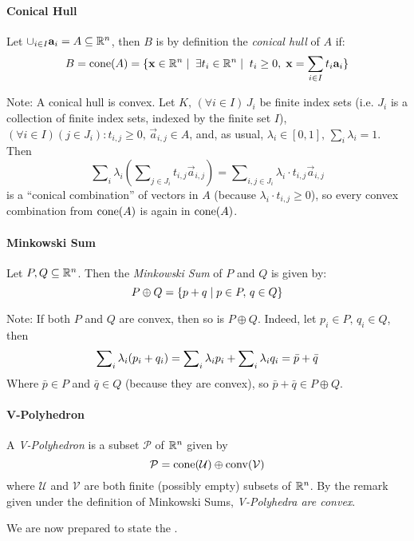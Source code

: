\paragraph{Conical Hull}  Let $\cup_{i\in I} \mathbf{a}_i = A \subseteq \mathbb{R}^n$, then $B$ is by definition the \textit{conical hull} of $A$ if:
  \[ B = \operatorname{cone}(A) = \{ \mathbf{x}\in \mathbb{R}^n \;|\;\; \exists t_i \in \mathbb{R}^n \;|\; \; t_i \geq 0,\; \mathbf{x} = \sum_{i\in I} t_i\mathbf{a}_i \} \]

Note: A conical hull is convex.  Let $K,\, (\forall i\in I)\, J_i$ be finite index sets (i.e. $J_i$ is a collection of finite index sets, indexed by the finite set $I$), $(\forall i \in I)(j \in J_i): t_{i,j} \geq 0,\, \vec{a}_{i,j} \in A$, and, as usual, $\lambda_i \in [0,1],\, \sum_i \lambda_i = 1$.  Then
  \[ \sum\nolimits_i \lambda_i \left(\sum\nolimits_{j \in J_i} t_{i,j} \vec{a}_{i,j}\right) = \sum\nolimits_{i,j\in J_i} \lambda_i \cdot t_{i,j} \vec{a}_{i,j}\]
is a ``conical combination'' of vectors in $A$ (because $\lambda_i\cdot t_{i,j} \geq 0$), so every convex combination from $\operatorname{cone}(A)$ is again in $\operatorname{cone}(A)$.

\paragraph{Minkowski Sum}
Let $P,Q \subseteq \mathbb{R}^n$.  Then the \textit{Minkowski Sum} of $P$ and $Q$ is given by:
  \[ P \oplus Q = \{ p + q \;|\; p \in P,\, q \in Q \} \]

Note:  If both $P$ and $Q$ are convex, then so is $P \oplus Q$.  Indeed, let $p_i \in P,\, q_i \in Q$, then
  \[\sum_i\nolimits \lambda_i(p_i + q_i) = 
  \sum\nolimits_{i} \lambda_{i} p_{i} + \sum\nolimits_{i} \lambda_{i} q_{i} = 
  \bar{p} + \bar{q}
  \]
Where $\bar{p} \in P$ and $\bar{q} \in Q$ (because they are convex), so $\bar{p} + \bar{q} \in P \oplus Q$.

\paragraph{V-Polyhedron}  A \textit{V-Polyhedron} is a subset $\mathcal{P}$ of $\mathbb{R}^n$ given by 
  \[ \mathcal{P} = \operatorname{cone}(\mathcal{U}) \oplus \operatorname{conv}(\mathcal{V}) \] 
where $\mathcal{U}$ and $\mathcal{V}$ are both finite (possibly empty) subsets of $\mathbb{R}^n$.  By the remark given under the definition of Minkowski Sums, \textit{V-Polyhedra are convex}.

\bigskip
\noindent We are now prepared to state the \MWT.


